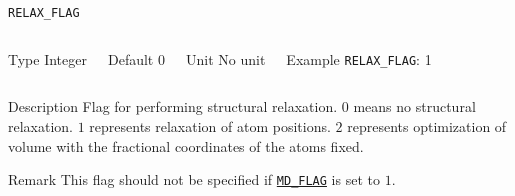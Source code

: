 \documentclass[xcolor=dvipsnames,t]{beamer}
\begin{document}
\begin{frame}[allowframebreaks]{\texttt{RELAX\_FLAG}} \label{RELAX_FLAG}
\vspace*{-12pt}
\begin{columns}
\begin{block}{Type}
Integer
\end{block}

\begin{block}{Default}
0
\end{block}

\begin{block}{Unit}
No unit
\end{block}

\begin{block}{Example}
\texttt{RELAX\_FLAG}: 1
\end{block}
\end{columns}

\begin{block}{Description}
Flag for performing structural relaxation. $0$ means no structural relaxation. $1$ represents relaxation of atom positions. $2$ represents optimization of volume with the fractional coordinates of the atoms fixed.
\end{block}

\begin{block}{Remark}
This flag should not be specified if \hyperlink{MD_FLAG}{\texttt{MD\_FLAG}} is set to $1$. 
\end{block}

\end{frame}
\end{document}

